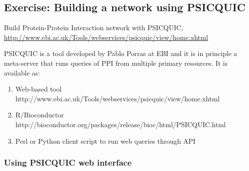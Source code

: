 \documentclass[11pt, oneside]{article}   	%
\begin{document}
\subsection{Exercise: Building a network using PSICQUIC}

Build Protein-Protein Interaction network with PSICQUIC, \url{http://www.ebi.ac.uk/Tools/webservices/psicquic/view/home.xhtml}

PSICQUIC is a tool developed by Pablo Porras at EBI and it is in principle a meta-server that runs queries of PPI from multiple primary resources. It is available as:

\begin{enumerate}
   
   \item Web-based tool http://www.ebi.ac.uk/Tools/webservices/psicquic/view/home.xhtml
   
   \item R/Bioconductor http://bioconductor.org/packages/release/bioc/html/PSICQUIC.html
   
   \item Perl or Python client script to run web queries through API

\end{enumerate}


\subsubsection{Using PSICQUIC web interface}
\end{document}
